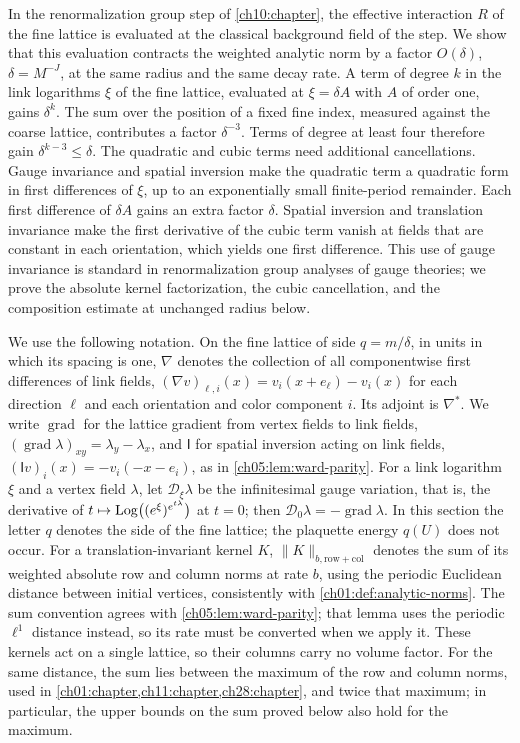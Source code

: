 In the renormalization group step of \cref{ch10:chapter}, the effective interaction $R$ of the fine lattice is evaluated at the classical background field of the step. We show that this evaluation contracts the weighted analytic norm by a factor $O(\delta)$, $\delta=M^{-J}$, at the same radius and the same decay rate. A term of degree $k$ in the link logarithms $\xi$ of the fine lattice, evaluated at $\xi=\delta A$ with $A$ of order one, gains $\delta^k$. The sum over the position of a fixed fine index, measured against the coarse lattice, contributes a factor $\delta^{-3}$. Terms of degree at least four therefore gain $\delta^{k-3}\le\delta$. The quadratic and cubic terms need additional cancellations. Gauge invariance and spatial inversion make the quadratic term a quadratic form in first differences of $\xi$, up to an exponentially small finite-period remainder. Each first difference of $\delta A$ gains an extra factor $\delta$. Spatial inversion and translation invariance make the first derivative of the cubic term vanish at fields that are constant in each orientation, which yields one first difference. This use of gauge invariance is standard in renormalization group analyses of gauge theories; we prove the absolute kernel factorization, the cubic cancellation, and the composition estimate at unchanged radius below.

We use the following notation. On the fine lattice of side $q=m/\delta$, in units in which its spacing is one, $\nabla$ denotes the collection of all componentwise first differences of link fields, $(\nabla v)_{\ell,i}(x)=v_i(x+e_\ell)-v_i(x)$ for each direction $\ell$ and each orientation and color component $i$. Its adjoint is $\nabla^*$. We write $\operatorname{grad}$ for the lattice gradient from vertex fields to link fields, $(\operatorname{grad}\lambda)_{xy}=\lambda_y-\lambda_x$, and $\mathsf I$ for spatial inversion acting on link fields, $(\mathsf Iv)_i(x)=-v_i(-x-e_i)$, as in \cref{ch05:lem:ward-parity}. For a link logarithm $\xi$ and a vertex field $\lambda$, let $\mathcal D_\xi\lambda$ be the infinitesimal gauge variation, that is, the derivative of $t\mapsto\operatorname{Log}\bigl((e^\xi)^{e^{t\lambda}}\bigr)$ at $t=0$; then $\mathcal D_0\lambda=-\operatorname{grad}\lambda$. In this section the letter $q$ denotes the side of the fine lattice; the plaquette energy $q(U)$ does not occur. For a translation-invariant kernel $K$, $\|K\|_{b,\mathrm{row+col}}$ denotes the sum of its weighted absolute row and column norms at rate $b$, using the periodic Euclidean distance between initial vertices, consistently with \cref{ch01:def:analytic-norms}. The sum convention agrees with \cref{ch05:lem:ward-parity}; that lemma uses the periodic $\ell^1$ distance instead, so its rate must be converted when we apply it. These kernels act on a single lattice, so their columns carry no volume factor. For the same distance, the sum lies between the maximum of the row and column norms, used in \cref{ch01:chapter,ch11:chapter,ch28:chapter}, and twice that maximum; in particular, the upper bounds on the sum proved below also hold for the maximum.

